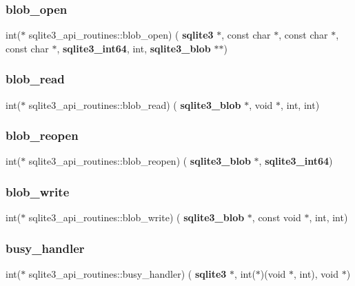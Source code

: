 \subsubsection{blob\_open}
{\footnotesize\ttfamily int($\ast$ sqlite3\+\_\+api\+\_\+routines\+::blob\+\_\+open) (\textbf{ sqlite3} $\ast$, const char $\ast$, const char $\ast$, const char $\ast$, \textbf{ sqlite3\+\_\+int64}, int, \textbf{ sqlite3\+\_\+blob} $\ast$$\ast$)}

\mbox{\label{structsqlite3__api__routines_a0813b9f5cea0e7c9fae5713e8226bb7d}} 
\subsubsection{blob\_read}
{\footnotesize\ttfamily int($\ast$ sqlite3\+\_\+api\+\_\+routines\+::blob\+\_\+read) (\textbf{ sqlite3\+\_\+blob} $\ast$, void $\ast$, int, int)}

\mbox{\label{structsqlite3__api__routines_a457411772bf6cf8883acd7a27526a68f}} 
\subsubsection{blob\_reopen}
{\footnotesize\ttfamily int($\ast$ sqlite3\+\_\+api\+\_\+routines\+::blob\+\_\+reopen) (\textbf{ sqlite3\+\_\+blob} $\ast$, \textbf{ sqlite3\+\_\+int64})}

\mbox{\label{structsqlite3__api__routines_a3a402cb876e7d4e4f60d70924e5cc04d}} 
\subsubsection{blob\_write}
{\footnotesize\ttfamily int($\ast$ sqlite3\+\_\+api\+\_\+routines\+::blob\+\_\+write) (\textbf{ sqlite3\+\_\+blob} $\ast$, const void $\ast$, int, int)}

\mbox{\label{structsqlite3__api__routines_ad7b688e04d388cdeb13d4c06fedb1c46}} 
\subsubsection{busy\_handler}
{\footnotesize\ttfamily int($\ast$ sqlite3\+\_\+api\+\_\+routines\+::busy\+\_\+handler) (\textbf{ sqlite3} $\ast$, int($\ast$)(void $\ast$, int), void $\ast$)}

